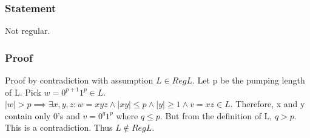 \documentclass{article}
\begin{document}
\subsubsection{Statement}
Not regular.
\subsubsection{Proof}
Proof by contradiction with assumption $L \in RegL$. Let p be the pumping length
of L. Pick $w = 0^{p+1}1^p \in L$. $\mid w \mid > p \implies \exists x, y, z: w
= xyz \land \mid xy \mid \leq p \land \mid y \mid \geq 1 \land v = xz \in L$.
Therefore, x and y contain only 0's and $v = 0^q1^p$ where $q \leq p$. But from
the definition of L, $q > p$. This is a contradiction. Thus $L \notin RegL$.
\end{document}
